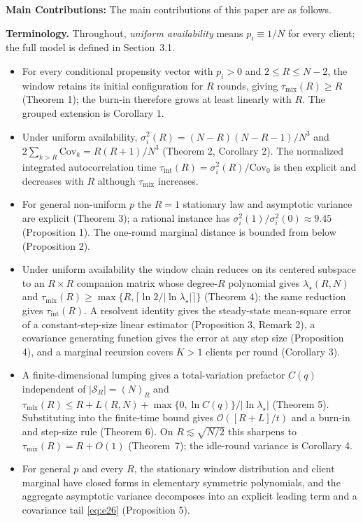 \documentclass[twoside,11pt]{article}
\begin{document}
\textbf{Main Contributions:} The main contributions of this paper are as follows.

\textbf{Terminology.} Throughout, \emph{uniform availability} means $p_i\equiv1/N$ for every client; the full model is defined in Section~3.1.
\begin{itemize}
\item For every conditional propensity vector with $p_i>0$ and $2\leq R\leq N-2$, the window retains its initial configuration for $R$ rounds, giving $\tau_{\mathrm{mix}}(R)\geq R$ (Theorem 1); the burn-in therefore grows at least linearly with $R$. The grouped extension is Corollary 1.
\item Under uniform availability, $\sigma_i^{2}(R)=(N-R)(N-R-1)/N^{3}$ and $2\sum_{k>R}\mathrm{Cov}_k=R(R+1)/N^{3}$ (Theorem 2, Corollary 2). The normalized integrated autocorrelation time $\tau_{\mathrm{int}}(R)=\sigma_i^{2}(R)/\mathrm{Cov}_0$ is then explicit and decreases with $R$ although $\tau_{\mathrm{mix}}$ increases.
\item For general non-uniform $p$ the $R=1$ stationary law and asymptotic variance are explicit (Theorem 3); a rational instance has $\sigma_i^{2}(1)/\sigma_i^{2}(0)\approx9.45$ (Proposition 1). The one-round marginal distance is bounded from below (Proposition 2).
\item Under uniform availability the window chain reduces on its centered
subspace to an $R\times R$ companion matrix whose degree-$R$ polynomial gives
$\lambda_\star(R,N)$ and
$\tau_{\mathrm{mix}}(R)\geq\max\{R,\lceil\ln2/|\ln\lambda_\star|\rceil\}$
(Theorem 4); the same reduction gives $\tau_{\mathrm{int}}(R)$. A resolvent
identity gives the steady-state mean-square error of a constant-step-size
linear estimator (Proposition 3, Remark 2), a covariance generating function
gives the error at any step size (Proposition 4), and a marginal recursion
covers $K>1$ clients per round (Corollary 3).
\item A finite-dimensional lumping gives a total-variation prefactor $C(q)$ independent of $|\mathcal{S}_R|=(N)_R$ and $\tau_{\mathrm{mix}}(R)\leq R+L(R,N)+\max\{0,\ln C(q)\}/|\ln\lambda_\star|$ (Theorem 5). Substituting into the finite-time bound \citep[Lemma~2]{ref1} gives $\mathcal{O}([R+L]/t)$ and a burn-in and step-size rule (Theorem 6). On $R\lesssim\sqrt{N/2}$ this sharpens to $\tau_{\mathrm{mix}}(R)=R+O(1)$ (Theorem~7); the idle-round variance is Corollary 4.
\item For general $p$ and every $R$, the stationary window distribution and client marginal have closed forms in elementary symmetric polynomials, and the aggregate asymptotic variance decomposes into an explicit leading term and a covariance tail \eqref{eq:e26} (Proposition 5).
\end{itemize}
\end{document}
